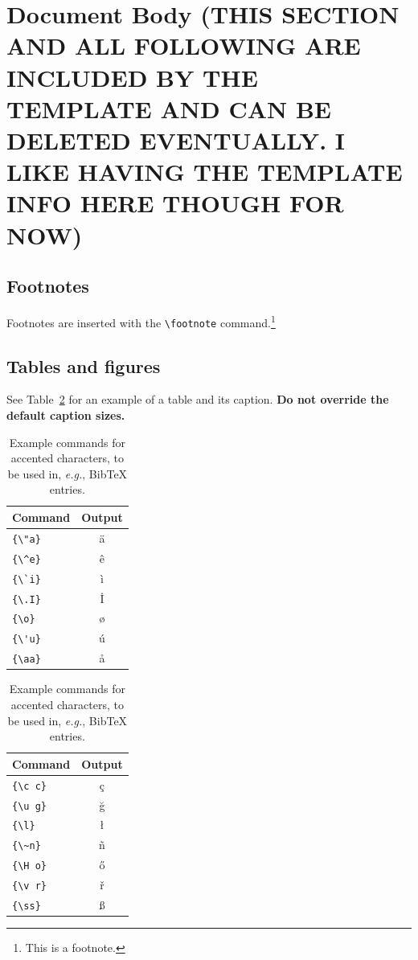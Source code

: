 \documentclass[11pt]{article}
\begin{document}
\section{Document Body (THIS SECTION AND ALL FOLLOWING ARE INCLUDED BY THE TEMPLATE AND CAN BE DELETED EVENTUALLY. I LIKE HAVING THE TEMPLATE INFO HERE THOUGH FOR NOW)}

\subsection{Footnotes}

Footnotes are inserted with the \verb|\footnote| command.\footnote{This is a footnote.}

\subsection{Tables and figures}

See Table~\ref{tab:accents} for an example of a table and its caption.
\textbf{Do not override the default caption sizes.}

\begin{table}
  \centering
  \begin{tabular}{lc}
    \hline
    \textbf{Command} & \textbf{Output} \\
    \hline
    \verb|{\"a}|     & {\"a}           \\
    \verb|{\^e}|     & {\^e}           \\
    \verb|{\`i}|     & {\`i}           \\
    \verb|{\.I}|     & {\.I}           \\
    \verb|{\o}|      & {\o}            \\
    \verb|{\'u}|     & {\'u}           \\
    \verb|{\aa}|     & {\aa}           \\\hline
  \end{tabular}
  \begin{tabular}{lc}
    \hline
    \textbf{Command} & \textbf{Output} \\
    \hline
    \verb|{\c c}|    & {\c c}          \\
    \verb|{\u g}|    & {\u g}          \\
    \verb|{\l}|      & {\l}            \\
    \verb|{\~n}|     & {\~n}           \\
    \verb|{\H o}|    & {\H o}          \\
    \verb|{\v r}|    & {\v r}          \\
    \verb|{\ss}|     & {\ss}           \\
    \hline
  \end{tabular}
  \caption{Example commands for accented characters, to be used in, \emph{e.g.}, Bib\TeX{} entries.}
  \label{tab:accents}
\end{table}
\end{document}
